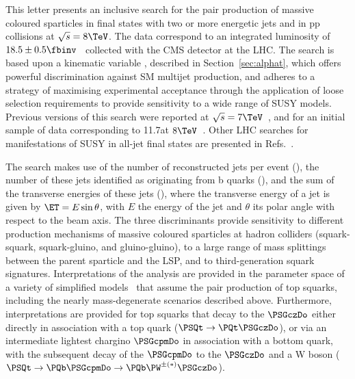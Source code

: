 This letter presents an inclusive search for the pair production of
massive coloured sparticles in final states with two or more energetic
jets and \ptvecmiss in pp collisions at $\sqrt{s} = 8\TeV$. The data
correspond to an integrated luminosity of $18.5 \pm
0.5\fbinv$~\cite{lumi} collected with the CMS detector at the LHC. The
search is based upon a kinematic variable \alphat, described in
Section~\ref{sec:alphat}, which offers powerful discrimination against
SM multijet production, and adheres to a strategy of maximising
experimental acceptance through the application of loose selection
requirements to provide sensitivity to a wide range of SUSY
models. Previous versions of this search were reported at $\sqrt{s} =
7\TeV$~\cite{RA1Paper, RA1Paper2011, RA1Paper2011FULL}, and for an
initial sample of data corresponding to 11.7\fbinv at
$8\TeV$~\cite{RA1Paper2012}. Other LHC searches for manifestations of
SUSY in all-jet final states are presented in Refs.~\cite{atlas-0,
  atlas-1, atlas-2, atlas-3, atlas-4, atlas-5, atlas-11, atlas-7,
  atlas-8, atlas-9, atlas-10, atlas-12, cms-1, cms-2, cms-3, cms-4,
  cms-8,cms-11,cms-5, cms-6, cms-7, cms-10, cms-12, cms-13, atlas-13,
  atlas-6, cms-9}. 

The search makes use of the number of reconstructed jets per event
(\njet), the number of these jets identified as originating from b
quarks (\nb), and the sum of the transverse energies
of these jets (\scalht), where the transverse energy of a jet is given
by $\ET = E\sin\theta$, with $E$ the energy of the jet and $\theta$
its polar angle with respect to the beam axis. The three discriminants
provide sensitivity to different production mechanisms of massive
coloured sparticles at hadron colliders (\ie squark-squark,
squark-gluino, and gluino-gluino), to a large range of mass splittings
between the parent sparticle and the LSP, and to third-generation
squark signatures.  Interpretations of the analysis are provided in
the parameter space of a variety of simplified
models~\cite{Alwall:2008ag, Alwall:2008va, sms} that assume the pair
production of top squarks, including the nearly mass-degenerate
scenarios described above. Furthermore, interpretations are provided
for top squarks that decay to the $\PSGczDo$ either directly in
association with a top quark ($\PSQt  \to \PQt
\PSGczDo$), or via an intermediate lightest chargino $\PSGcpmDo$ in
association with a bottom quark, with the subsequent decay
of the $\PSGcpmDo$ to the $\PSGczDo$ and a W boson ($\PSQt
\to \PQb \PSGcpmDo  \to  {\PQb\PW}^{\pm(*)}
\PSGczDo$).

